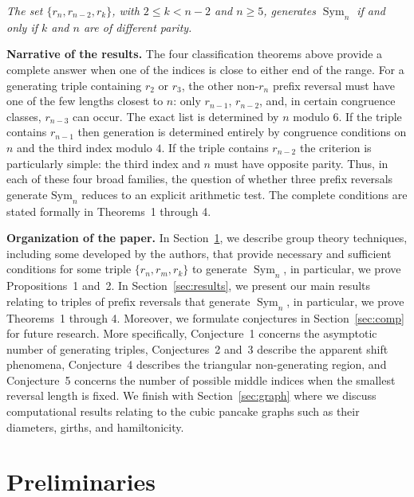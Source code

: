 \documentclass[
final
]{dmtcs-episciences}
\DeclareMathOperator{\Sym}{\mathrm{Sym}}
\begin{document}
\medskip    

 {\it  The set $\{ r_n, r_{n-2}, r_k\}$, with $2\leqslant k<n-2$ and $n\geqslant5$, generates $\Sym_n$ if and only if $k$ and $n$ are of different parity.}

 \medskip


\textbf{Narrative of the results.}  The four classification theorems above provide a complete answer when one of the indices is close to either end of the range. For a generating triple containing $r_2$ or $r_3$, the other non-$r_n$ prefix reversal must have one of the few lengths closest to $n$: only $r_{n-1}$, $r_{n-2}$, and, in certain congruence classes, $r_{n-3}$ can occur. The exact list is determined by $n$  modulo $6$. If the triple contains $r_{n-1}$ then generation is determined entirely by congruence conditions on $n$ and the third index modulo $4$. If the triple contains $r_{n-2}$ the criterion is particularly simple: the third index and $n$ must have opposite parity. Thus, in each of these four broad families, the question of whether three prefix reversals generate $\mathrm{Sym}_n$ reduces to an explicit arithmetic test. The complete conditions are stated formally in Theorems~1 through 4.

\medskip

\textbf{Organization of the paper.} In Section~\ref{sec:prelim}, we describe group theory techniques, including some developed by the authors, that provide necessary and sufficient conditions for some triple $\{r_n,r_m,r_k\}$ to generate $\Sym_n$, in particular, we prove Propositions~1 and~2. In Section~\ref{sec:results}, we present our main results relating to triples of prefix reversals that generate $\Sym_n$, in particular, we prove Theorems~1 through 4.   %
Moreover, we formulate conjectures in Section~\ref{sec:comp} for future research. More specifically, Conjecture~1 concerns the asymptotic number of generating triples, Conjectures~2 and~3 describe the apparent shift phenomena, Conjecture~4 describes the triangular non-generating region, and Conjecture~5 concerns the number of possible middle indices when the smallest reversal length is fixed. We finish with Section~\ref{sec:graph} where we discuss computational results relating to the cubic pancake graphs such as their diameters, girths, and hamiltonicity.

\section{Preliminaries}\label{sec:prelim}
\end{document}
